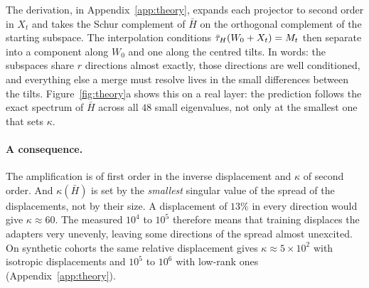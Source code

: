 The derivation, in Appendix~\ref{app:theory}, expands each projector to second
order in $X_t$ and takes the Schur complement of $\bar H$ on the orthogonal
complement of the starting subspace. The interpolation conditions
$\bar{\tau}_H(W_0 + X_t) = M_t$ then separate into a component along $W_0$ and one
along the centred tilts. In words: the subspaces share $r$ directions almost
exactly, those directions are well conditioned, and everything else a merge
must resolve lives in the small differences between the tilts.
Figure~\ref{fig:theory}a shows this on a real layer: the prediction follows
the exact spectrum of $\bar H$ across all $48$ small eigenvalues, not only at
the smallest one that sets $\kappa$.

\paragraph{A consequence.} The amplification is of first order in the inverse
displacement and $\kappa$ of second order. And $\kappa(\bar H)$ is set by the
\emph{smallest} singular value of the spread of the displacements, not by
their size. A displacement of $13\%$ in every direction would give
$\kappa \approx 60$. The measured $10^{4}$ to $10^{5}$ therefore means that
training displaces the adapters very unevenly, leaving some directions of the
spread almost unexcited. On synthetic cohorts the same relative displacement
gives $\kappa \approx 5\times10^{2}$ with isotropic displacements and $10^{5}$
to $10^{6}$ with low-rank ones (Appendix~\ref{app:theory}).


